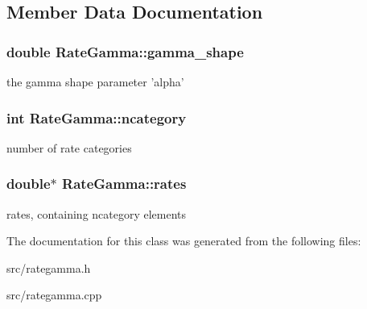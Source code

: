 \subsection{Member Data Documentation}
\hypertarget{classRateGamma_a88433a75c040757da67d9007c2ab9db4}{
\subsubsection[{gamma\_\-shape}]{\setlength{\rightskip}{0pt plus 5cm}double {\bf RateGamma::gamma\_\-shape}}}
\label{classRateGamma_a88433a75c040757da67d9007c2ab9db4}
the gamma shape parameter 'alpha' \hypertarget{classRateGamma_adeaf25f809c07e9fdf368bece8190900}{
\subsubsection[{ncategory}]{\setlength{\rightskip}{0pt plus 5cm}int {\bf RateGamma::ncategory}}}
\label{classRateGamma_adeaf25f809c07e9fdf368bece8190900}
number of rate categories \hypertarget{classRateGamma_a9f72703c81eb78da12198c44fcf7d68c}{
\subsubsection[{rates}]{\setlength{\rightskip}{0pt plus 5cm}double$\ast$ {\bf RateGamma::rates}}}
\label{classRateGamma_a9f72703c81eb78da12198c44fcf7d68c}
rates, containing ncategory elements 

The documentation for this class was generated from the following files:\begin{DoxyCompactItemize}
\item 
src/rategamma.h\item 
src/rategamma.cpp\end{DoxyCompactItemize}
